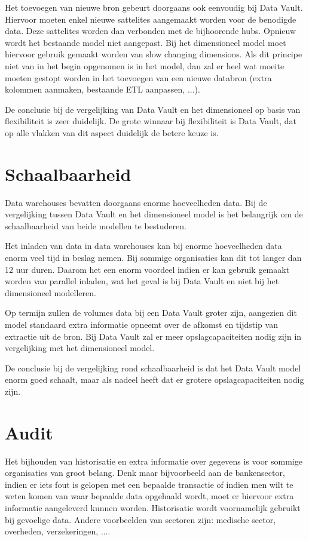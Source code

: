 Het toevoegen van nieuwe bron gebeurt doorgaans ook eenvoudig bij Data Vault. Hiervoor moeten enkel nieuwe sattelites aangemaakt worden voor de benodigde data. Deze sattelites worden dan verbonden met de bijhoorende hubs. Opnieuw wordt het bestaande model niet aangepast. Bij het dimensioneel model moet hiervoor gebruik gemaakt worden van slow changing dimensions. Als dit principe niet van in het begin opgenomen is in het model, dan zal er heel wat moeite moeten gestopt worden in het toevoegen van een nieuwe databron (extra kolommen aanmaken, bestaande ETL aanpassen, ...).

De conclusie bij de vergelijking van Data Vault en het dimensioneel op basis van flexibiliteit is zeer duidelijk. De grote winnaar bij flexibiliteit is Data Vault, dat op alle vlakken van dit aspect duidelijk de betere keuze is.

\section{Schaalbaarheid}
Data warehouses bevatten doorgaans enorme hoeveelheden data. Bij de vergelijking tussen Data Vault en het dimensioneel model is het belangrijk om de schaalbaarheid van beide modellen te bestuderen. 

Het inladen van data in data warehouses kan bij enorme hoeveelheden data enorm veel tijd in beslag nemen. Bij sommige organisaties kan dit tot langer dan 12 uur duren. Daarom het een enorm voordeel indien er kan gebruik gemaakt worden van parallel inladen, wat het geval is bij Data Vault en niet bij het dimensioneel modelleren.

Op termijn zullen de volumes data bij een Data Vault groter zijn, aangezien dit model standaard extra informatie opneemt over de afkomst en tijdstip van extractie uit de bron. Bij Data Vault zal er meer opslagcapaciteiten nodig zijn in vergelijking met het dimensioneel model.

De conclusie bij de vergelijking rond schaalbaarheid is dat het Data Vault model enorm goed schaalt, maar als nadeel heeft dat er grotere opslagcapaciteiten nodig zijn.

\section{Audit}
Het bijhouden van historisatie en extra informatie over gegevens is voor sommige organisaties van groot belang. Denk maar bijvoorbeeld aan de bankensector, indien er iets fout is gelopen met een bepaalde transactie of indien men wilt te weten komen van waar bepaalde data opgehaald wordt, moet er hiervoor extra informatie aangeleverd kunnen worden. Historisatie wordt voornamelijk gebruikt bij gevoelige data. Andere voorbeelden van sectoren zijn: medische sector, overheden, verzekeringen, ....

